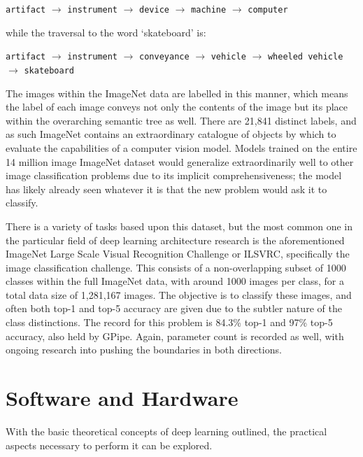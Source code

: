 \begin{center}
\texttt{artifact} $\rightarrow$ \texttt{instrument} $\rightarrow$ \texttt{device} $\rightarrow$ \texttt{machine} $\rightarrow$ \texttt{computer}
\end{center}

\noindent while the traversal to the word `skateboard' is:
\begin{center}
\texttt{artifact} $\rightarrow$ \texttt{instrument} $\rightarrow$ \texttt{conveyance} $\rightarrow$ \texttt{vehicle} $\rightarrow$ \texttt{wheeled vehicle} $\rightarrow$ \texttt{skateboard}
\end{center}

\noindent
{}
The images within the ImageNet data are labelled in this manner, which means the label of each image conveys not only
the contents of the image but its place within the overarching semantic tree as well. There are 21,841 distinct labels,
and as such ImageNet contains an extraordinary catalogue of objects by which to evaluate the capabilities of a computer
vision model. Models trained on the entire 14 million image ImageNet dataset would generalize extraordinarily well to
other image classification problems due to its implicit comprehensiveness; the model has likely already seen whatever
it is that the new problem would ask it to classify.

There is a variety of tasks based upon this dataset, but the most common one in the particular field of deep learning
architecture research is the aforementioned ImageNet Large Scale Visual Recognition Challenge or ILSVRC, specifically
the image classification challenge. This consists of a non-overlapping subset of 1000 classes within the full ImageNet
data, with around 1000 images per class, for a total data size of 1,281,167 images. The objective is to classify these
images, and often both top-1 and top-5 accuracy are given due to the subtler nature of the class distinctions. The record
for this problem is 84.3\% top-1 and 97\% top-5 accuracy, also held by GPipe. Again, parameter count is recorded as well,
with ongoing research into pushing the boundaries in both directions.

\section{Software and Hardware} \label{sect:hardware}
With the basic theoretical concepts of deep learning outlined, the practical aspects necessary to
perform it can be explored.

